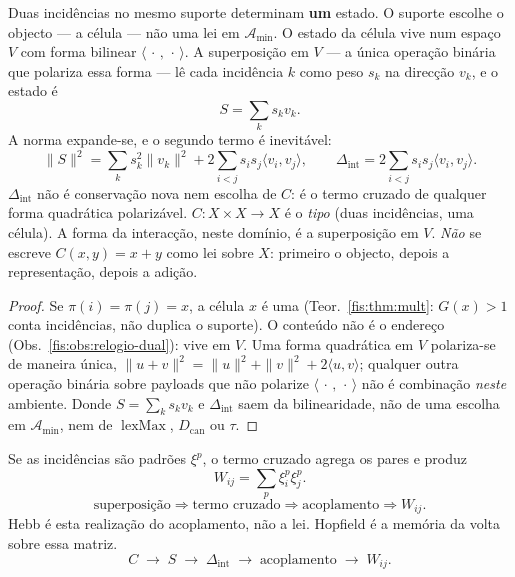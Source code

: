 \documentclass[livro.tex]{subfiles}
\begin{document}
\begin{teorema}\label{fis:thm:combina}
Duas incidências no mesmo suporte determinam \textbf{um} estado. O suporte
escolhe o objecto --- a célula --- não uma lei em $\mathcal A_{\min}$.
O estado da célula vive num espaço $V$ com forma bilinear
$\langle\,\cdot\,,\,\cdot\,\rangle$. A superposição em $V$ --- a única
operação binária que polariza essa forma --- lê cada incidência $k$ como
peso $s_k$ na direcção $v_k$, e o estado é
\[
S=\sum_k s_k v_k.
\]
A norma expande-se, e o segundo termo é inevitável:
\[
\|S\|^2
=\sum_k s_k^2\|v_k\|^2
+2\sum_{i<j}s_is_j\langle v_i,v_j\rangle,
\qquad
\boxed{\Delta_{\mathrm{int}}
=2\sum_{i<j}s_is_j\langle v_i,v_j\rangle.}
\]
$\Delta_{\mathrm{int}}$ não é conservação nova nem escolha de $C$: é o
termo cruzado de qualquer forma quadrática polarizável. $C\colon X\times X\to X$
é o \emph{tipo} (duas incidências, uma célula). A forma da interacção, neste
domínio, é a superposição em $V$. \emph{Não} se escreve $C(x,y)=x+y$ como
lei sobre $X$: primeiro o objecto, depois a representação, depois a adição.
\end{teorema}

\begin{proof}
Se $\pi(i)=\pi(j)=x$, a célula $x$ é uma (Teor.~\ref{fis:thm:mult}: $G(x)>1$
conta incidências, não duplica o suporte). O conteúdo não é o endereço
(Obs.~\ref{fis:obs:relogio-dual}): vive em $V$. Uma forma quadrática em $V$
polariza-se de maneira única,
$\|u+v\|^2=\|u\|^2+\|v\|^2+2\langle u,v\rangle$; qualquer outra operação
binária sobre payloads que não polarize $\langle\,\cdot\,,\,\cdot\,\rangle$
não é combinação \emph{neste} ambiente. Donde $S=\sum_k s_k v_k$ e
$\Delta_{\mathrm{int}}$ saem da bilinearidade, não de uma escolha em
$\mathcal A_{\min}$, nem de $\operatorname{lexMax}$, $D_{\mathrm{can}}$ ou
$\tau$.
\end{proof}

\begin{corolario}\label{fis:cor:hebb}
Se as incidências são padrões $\xi^p$, o termo cruzado agrega os pares e
produz
\[
W_{ij}=\sum_p\xi_i^p\xi_j^p.
\]
\[
\boxed{\text{superposição}\Rightarrow\text{termo cruzado}\Rightarrow
\text{acoplamento}\Rightarrow W_{ij}.}
\]
Hebb é esta realização do acoplamento, não a lei. Hopfield é a memória da
volta sobre essa matriz.
\[
\boxed{C\;\longrightarrow\;S\;\longrightarrow\;\Delta_{\mathrm{int}}
\;\longrightarrow\;\text{acoplamento}\;\longrightarrow\;W_{ij}.}
\]
\end{corolario}
\end{document}
